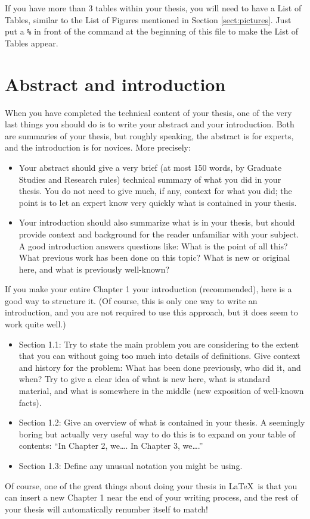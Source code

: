 \documentclass[modernstyle,12pt]{sjsuthesis}
\theoremstyle{definition}
\begin{document}
If you have more than 3 tables within your thesis, you will need to
have a List of Tables, similar to the List of Figures mentioned in
Section \ref{sect:pictures}.  Just put a {\tt \%} in front of the
\verb@\emptyLoT@ command at the beginning of this file to make the
List of Tables appear.



\section{Abstract and introduction}

When you have completed the technical content of your thesis, one of
the very last things you should do is to write your abstract and your
introduction.  Both are summaries of your thesis, but roughly
speaking, the abstract is for experts, and the introduction is for
novices.  More precisely:

\begin{itemize}
\item Your abstract should give a very brief (at most 150 words, by
  Graduate Studies and Research rules) technical summary of what you
  did in your thesis.  You do not need to give much, if any, context
  for what you did; the point is to let an expert know very quickly
  what is contained in your thesis.
\item Your introduction should also summarize what is in your thesis,
  but should provide context and background for the reader unfamiliar
  with your subject.  A good introduction answers questions like: What
  is the point of all this?  What previous work has been done on this
  topic?  What is new or original here, and what is previously
  well-known?
\end{itemize}

If you make your entire Chapter 1 your introduction (recommended),
here is a good way to structure it.  (Of course, this is only one way
to write an introduction, and you are not required to use this
approach, but it does seem to work quite well.)
\begin{itemize}
\item Section 1.1: Try to state the main problem you are considering
  to the extent that you can without going too much into details of
  definitions.  Give context and history for the problem: What has
  been done previously, who did it, and when?  Try to give a clear
  idea of what is new here, what is standard material, and what is
  somewhere in the middle (new exposition of well-known facts).
\item Section 1.2: Give an overview of what is contained in your
  thesis.  A seemingly boring but actually very useful way to do this
  is to expand on your table of contents: ``In Chapter 2, we\ldots.
  In Chapter 3, we\ldots.''
\item Section 1.3: Define any unusual notation you might be using.
\end{itemize}
Of course, one of the great things about doing your thesis in \LaTeX\
is that you can insert a new Chapter 1 near the end of your writing
process, and the rest of your thesis will automatically renumber
itself to match!
\end{document}
